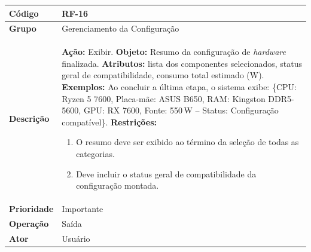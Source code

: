 \FloatBarrier
\begin{quadro}[htb]
  \caption{RF-16 -- Exibir resumo da configuração finalizada}
  \label{quad:rf16}
  \begin{tabular}{|p{3.2cm}|p{11.8cm}|}
    \hline
    \textbf{Código}     & RF-16                                                              \\ \hline
    \textbf{Grupo}      & Gerenciamento da Configuração                                      \\ \hline
    \textbf{Descrição}  &
    \textbf{Ação:} Exibir.
    \textbf{Objeto:} Resumo da configuração de \textit{hardware} finalizada.
    \textbf{Atributos:} lista dos componentes selecionados, status geral de compatibilidade, consumo total estimado (W).
    \textbf{Exemplos:} Ao concluir a última etapa, o sistema exibe: \{CPU: Ryzen 5 7600, Placa-mãe: ASUS B650, RAM: Kingston DDR5-5600, GPU: RX 7600, Fonte: 550\,W -- Status: Configuração compatível\}.
    \textbf{Restrições:}
    \begin{enumerate}[nosep,leftmargin=1.2em,topsep=2pt,partopsep=0pt,parsep=0pt,itemsep=1pt]
      \item O resumo deve ser exibido ao término da seleção de todas as categorias.
      \item Deve incluir o status geral de compatibilidade da configuração montada.
    \end{enumerate} \\ \hline
    \textbf{Prioridade} & Importante                                                         \\ \hline
    \textbf{Operação}   & Saída                                                              \\ \hline
    \textbf{Ator}       & Usuário                                                            \\ \hline
  \end{tabular}
\end{quadro}

